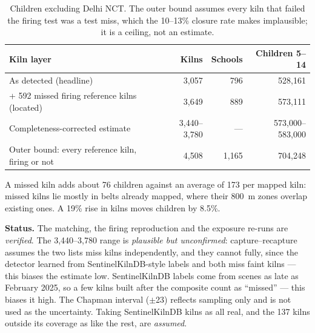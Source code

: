 \documentclass[11pt,a4paper]{article}
\begin{document}
\begin{table}[H]
\centering\small
\begin{tabular}{@{}lrrr@{}}
\toprule
Kiln layer & Kilns & Schools & Children 5--14 \\
\midrule
As detected (headline)                              & 3{,}057 & 796     & 528{,}161 \\
+ 592 missed firing reference kilns (located)       & 3{,}649 & 889     & 573{,}111 \\
Completeness-corrected estimate                     & 3{,}440--3{,}780 & --- & 573{,}000--583{,}000 \\
Outer bound: every reference kiln, firing or not    & 4{,}508 & 1{,}165 & 704{,}248 \\
\bottomrule
\end{tabular}
\caption{Children excluding Delhi NCT. The outer bound assumes every kiln that
failed the firing test was a test miss, which the 10--13\% closure rate makes
implausible; it is a ceiling, not an estimate.}
\end{table}

A missed kiln adds about 76 children against an average of 173 per mapped kiln:
missed kilns lie mostly in belts already mapped, where their 800~m zones overlap
existing ones. A 19\% rise in kilns moves children by 8.5\%.

\textbf{Status.} The matching, the firing reproduction and the exposure re-runs
are \emph{verified}. The 3{,}440--3{,}780 range is \emph{plausible but
unconfirmed}: capture--recapture assumes the two lists miss kilns independently,
and they cannot fully, since the detector learned from SentinelKilnDB-style
labels and both miss faint kilns --- this biases the estimate low. SentinelKilnDB
labels come from scenes as late as February 2025, so a few kilns built after
the composite count as ``missed'' --- this biases it high. The Chapman interval
($\pm$23) reflects sampling only and is not used as the uncertainty. Taking
SentinelKilnDB kilns as all real, and the 137 kilns outside its coverage as like
the rest, are \emph{assumed}.

\end{document}
